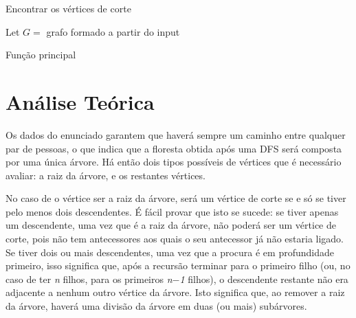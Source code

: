 \documentclass[12pt,a4paper,notitlepage]{article}
\begin{document}
\begin{algorithm}[H]
	
	\caption{Encontrar os vértices de corte}
\end{algorithm}

\begin{algorithm}[H]
		Let $G =$ grafo formado a partir do input\;
		\;
		\;
\caption{Função principal}
\end{algorithm}
\pagebreak

\section{Análise Teórica}
Os dados do enunciado garantem que haverá sempre um caminho entre qualquer par de pessoas, o que indica que a floresta obtida após uma DFS será composta por uma única árvore.
Há então dois tipos possíveis de vértices que é necessário avaliar: a raiz da árvore, e os restantes vértices.

No caso de o vértice ser a raiz da árvore, será um vértice de corte se e só se tiver pelo menos dois descendentes.
É fácil provar que isto se sucede: se tiver apenas um descendente, uma vez que é a raiz da árvore, não poderá ser um vértice de corte, pois não tem antecessores aos quais o seu antecessor já não estaria ligado.
Se tiver dois ou mais descendentes, uma vez que a procura é em profundidade primeiro, isso significa que, após a recursão terminar para o primeiro filho (ou, no caso de ter \emph{n} filhos, para os primeiros \emph{n$-$1} filhos), o descendente restante não era adjacente a nenhum outro vértice da árvore. Isto significa que, ao remover a raiz da árvore, haverá uma divisão da árvore em duas (ou mais) subárvores. 
\end{document}
